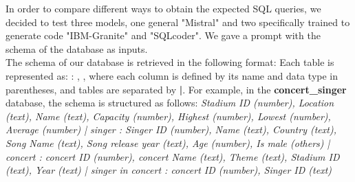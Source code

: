 \documentclass[12pt,a4paper]{article}
\begin{document}
In order to compare different ways to obtain the expected SQL queries, we decided to test three models, one general "Mistral" and two specifically trained to generate code "IBM-Granite" and "SQLcoder". We gave a prompt with the schema of the database as inputs. \\

The schema of our database is retrieved in the following format:  
Each table is represented as:  
: , ,
where each column is defined by its name and data type in parentheses, and tables are separated by \textbf{|}.  
For example, in the \textbf{concert\_singer} database, the schema is structured as follows:  
\textit{Stadium ID (number), Location (text), Name (text), Capacity (number), Highest (number), Lowest (number), Average (number) | singer : Singer ID (number), Name (text), Country (text), Song Name (text), Song release year (text), Age (number), Is male (others) | concert : concert ID (number), concert Name (text), Theme (text), Stadium ID (text), Year (text) | singer in concert : concert ID (number), Singer ID (text)}\\
\end{document}
